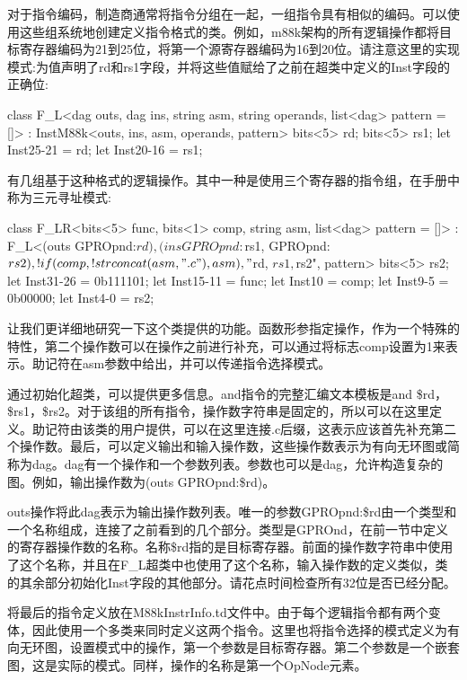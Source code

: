 对于指令编码，制造商通常将指令分组在一起，一组指令具有相似的编码。可以使用这些组系统地创建定义指令格式的类。例如，m88k架构的所有逻辑操作都将目标寄存器编码为21到25位，将第一个源寄存器编码为16到20位。请注意这里的实现模式:为值声明了rd和rs1字段，并将这些值赋给了之前在超类中定义的Inst字段的正确位:

\begin{cpp}
class F_L<dag outs, dag ins, string asm, string operands,
          list<dag> pattern = []>
        : InstM88k<outs, ins, asm, operands, pattern> {
    bits<5> rd;
    bits<5> rs1;
    let Inst{25-21} = rd;
    let Inst{20-16} = rs1;
}
\end{cpp}

有几组基于这种格式的逻辑操作。其中一种是使用三个寄存器的指令组，在手册中称为三元寻址模式:

\begin{cpp}
class F_LR<bits<5> func, bits<1> comp, string asm,
            list<dag> pattern = []>
    : F_L<(outs GPROpnd:$rd), (ins GPROpnd:$rs1, GPROpnd:$rs2),
            !if(comp, !strconcat(asm, ".c"), asm),
            "$rd, $rs1, $rs2", pattern> {
    bits<5> rs2;
    let Inst{31-26} = 0b111101;
    let Inst{15-11} = func;
    let Inst{10} = comp;
    let Inst{9-5} = 0b00000;
    let Inst{4-0} = rs2;
}
\end{cpp}

让我们更详细地研究一下这个类提供的功能。函数形参指定操作，作为一个特殊的特性，第二个操作数可以在操作之前进行补充，可以通过将标志comp设置为1来表示。助记符在asm参数中给出，并可以传递指令选择模式。

通过初始化超类，可以提供更多信息。and指令的完整汇编文本模板是and \$rd，\$rs1，\$rs2。对于该组的所有指令，操作数字符串是固定的，所以可以在这里定义。助记符由该类的用户提供，可以在这里连接.c后缀，这表示应该首先补充第二个操作数。最后，可以定义输出和输入操作数，这些操作数表示为有向无环图或简称为dag。dag有一个操作和一个参数列表。参数也可以是dag，允许构造复杂的图。例如，输出操作数为(outs GPROpnd:\$rd)。

outs操作将此dag表示为输出操作数列表。唯一的参数GPROpnd:\$rd由一个类型和一个名称组成，连接了之前看到的几个部分。类型是GPROnd，在前一节中定义的寄存器操作数的名称。名称\$rd指的是目标寄存器。前面的操作数字符串中使用了这个名称，并且在F\_L超类中也使用了这个名称，输入操作数的定义类似，类的其余部分初始化Inst字段的其他部分。请花点时间检查所有32位是否已经分配。

将最后的指令定义放在M88kInstrInfo.td文件中。由于每个逻辑指令都有两个变体，因此使用一个多类来同时定义这两个指令。这里也将指令选择的模式定义为有向无环图，设置模式中的操作，第一个参数是目标寄存器。第二个参数是一个嵌套图，这是实际的模式。同样，操作的名称是第一个OpNode元素。

